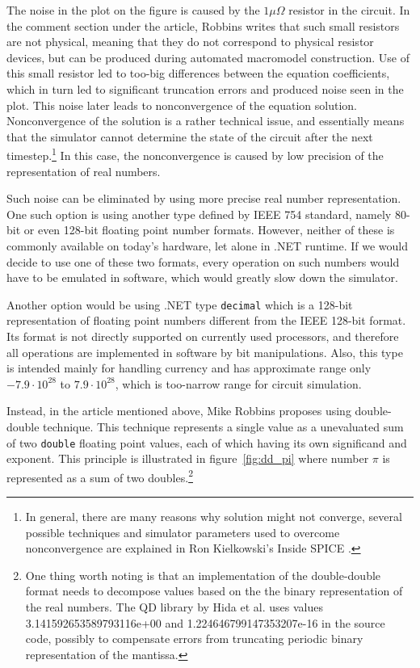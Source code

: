 The noise in the plot on the figure is caused by the $1\mu\Omega$ resistor in the circuit. In the comment section under the article, Robbins writes that such small resistors are not physical, meaning that they do not correspond to physical resistor devices, but can be produced during automated macromodel construction. Use of this small resistor led to too-big differences between the equation coefficients, which in turn led to significant truncation errors and produced noise seen in the plot. This noise later leads to nonconvergence of the equation solution. Nonconvergence of the solution is a rather technical issue, and essentially means that the simulator cannot determine the state of the circuit after the next timestep.\footnote{In general, there are many reasons why solution might not converge, several possible techniques and simulator parameters used to overcome nonconvergence are explained in Ron Kielkowski's Inside SPICE \cite{inside_spice}.} In this case, the nonconvergence is caused by low precision of the representation of real numbers.

Such noise can be eliminated by using more precise real number representation. One such option is using another type defined by IEEE 754 standard, namely 80-bit or even 128-bit floating point number formats. However, neither of these is commonly available on today's hardware, let alone in .NET runtime. If we would decide to use one of these two formats, every operation on such numbers would have to be emulated in software, which would greatly slow down the simulator.

Another option would be using .NET type \texttt{decimal} which is a 128-bit representation of floating point numbers different from the IEEE 128-bit format. Its format is not directly supported on currently used processors, and therefore all operations are implemented in software by bit manipulations. Also, this type is intended mainly for handling currency and has approximate range only $-7.9 \cdot 10^{28}$ to $7.9 \cdot 10^{28}$,  which is too-narrow range for circuit simulation.

Instead, in the article mentioned above, Mike Robbins proposes using double-double technique. This technique represents a single value as a unevaluated sum of two \texttt{double} floating point values, each of which having its own significand and exponent. This principle is illustrated in figure~\ref{fig:dd_pi} where number $\pi$ is represented as a sum of two doubles.\footnote{One thing worth noting is that an implementation of the double-double format needs to decompose values based on the the binary representation of the real numbers. The QD library by Hida et al. \cite{qd-lib} uses values 3.141592653589793116e+00 and 1.224646799147353207e-16 in the source code, possibly to compensate errors from truncating periodic binary representation of the mantissa.}

